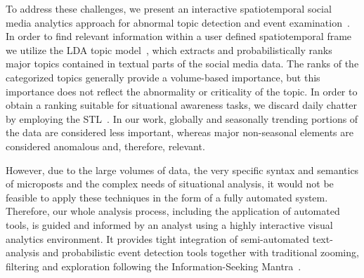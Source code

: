 
To address these challenges, we present an interactive spatiotemporal social media analytics approach
for abnormal topic detection and event examination~\cite{CHAE:2012:SSM}.
In order to find relevant information within a user defined spatiotemporal frame
we utilize the LDA topic model~\cite{Blei:2003:LDA}, which extracts 
and probabilistically ranks major topics contained in textual parts of the social media data.
The ranks of the categorized topics generally provide a volume-based importance,
but this importance does not reflect the abnormality or criticality of the topic. 
In order to obtain a ranking suitable for situational awareness tasks, we discard daily chatter
by employing the STL~\cite{Cleveland:1990:SAS}.
In our work, globally and seasonally trending portions of the data are considered less important,
whereas major non-seasonal elements are considered anomalous and, therefore, relevant.

However, due to the large volumes of data, the very specific syntax and semantics of microposts and 
the complex needs of situational analysis, it would not be feasible to apply these techniques 
in the form of a fully automated system. 
Therefore, our whole analysis process, including the application of automated tools, is guided and 
informed by an analyst using a highly interactive visual analytics environment. 
It provides tight integration of semi-automated text-analysis and probabilistic event detection tools 
together with traditional zooming, filtering and exploration following the Information-Seeking Mantra~\cite{Shneiderman:1996:TEH}.

